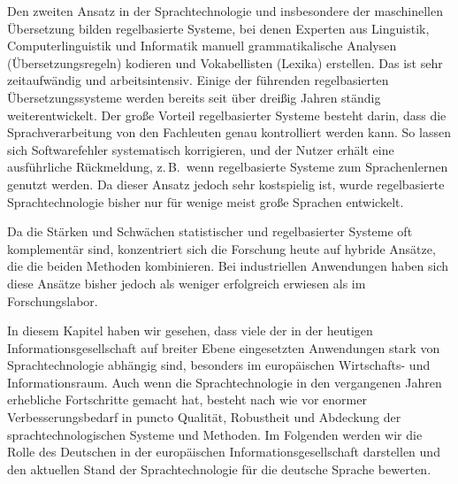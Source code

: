 \begin{multicols}{2}
Den zweiten Ansatz in der Sprachtechnologie und insbesondere der maschinellen Übersetzung bilden regelbasierte Systeme, bei denen Experten aus Linguistik, Computerlinguistik und Informatik manuell grammatikalische Analysen (Übersetzungsregeln) kodieren und Vokabellisten (Lexika) erstellen. Das ist sehr zeitaufwändig und arbeitsintensiv. Einige der führenden regelbasierten Übersetzungssysteme werden bereits seit über dreißig Jahren ständig weiterentwickelt. Der große Vorteil regelbasierter Systeme besteht darin, dass die Sprachverarbeitung von den Fachleuten genau kontrolliert werden kann. So lassen sich Softwarefehler systematisch korrigieren, und der Nutzer erhält eine ausführliche Rückmeldung, z.\,B.~wenn regelbasierte Systeme zum Sprachenlernen genutzt werden. Da dieser Ansatz jedoch sehr kostspielig ist, wurde regelbasierte Sprachtechnologie bisher nur für wenige meist große Sprachen entwickelt.

Da die Stärken und Schwächen statistischer und regelbasierter Systeme oft komplementär sind, konzentriert sich die Forschung heute auf hybride Ansätze, die die beiden Methoden kombinieren. Bei industriellen Anwendungen haben sich diese Ansätze bisher jedoch als weniger erfolgreich erwiesen als im Forschungslabor. 

In diesem Kapitel haben wir gesehen, dass viele der in der heutigen Informationsgesellschaft auf breiter Ebene eingesetzten Anwendungen stark von Sprachtechnologie abhängig sind, besonders im europäischen Wirtschafts- und Informationsraum. Auch wenn die Sprachtechnologie in den vergangenen Jahren erhebliche Fortschritte gemacht hat, besteht nach wie vor enormer Verbesserungsbedarf in puncto Qualität, Robustheit und Abdeckung der sprachtechnologischen Systeme und Methoden. Im Folgenden werden wir die Rolle des Deutschen in der europäischen Informationsgesellschaft darstellen und den aktuellen Stand der Sprachtechnologie für die deutsche Sprache bewerten.  
\end{multicols}

\clearpage


